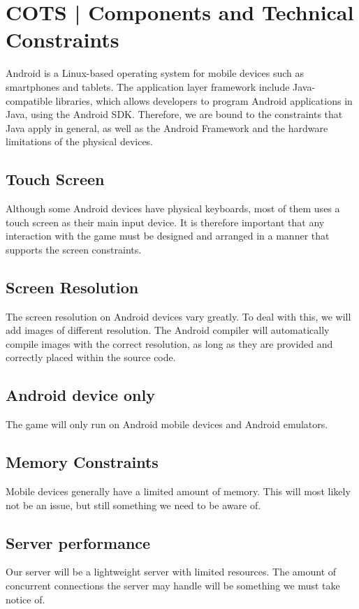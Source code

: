 \section{COTS | Components and Technical Constraints}
\label{sec:COTS}
Android is a Linux-based operating system for mobile devices such as
smartphones and tablets. The application layer framework include
Java-compatible libraries, which allows developers to program Android
applications in Java, using the Android SDK\@. Therefore, we are bound to the
constraints that Java apply in general, as well as the Android Framework and
the hardware limitations of the physical devices.

\subsection{Touch Screen}
Although some Android devices have physical keyboards, most of them uses a
touch screen as their main input device. It is therefore important that any
interaction with the game must be designed and arranged in a manner that
supports the screen constraints. 

\subsection{Screen Resolution}
The screen resolution on Android devices vary greatly. To deal with this, we
will add images of different resolution. The Android compiler will
automatically compile images with the correct resolution, as long as they are
provided and correctly placed within the source code.

\subsection{Android device only}
The game will only run on Android mobile devices and Android emulators.

\subsection{Memory Constraints}
Mobile devices generally have a limited amount of memory. This will most likely
not be an issue, but still something we need to be aware of.

\subsection{Server performance}
Our server will be a lightweight server with limited resources. The amount of
concurrent connections the server may handle will be something we must take
notice of.
